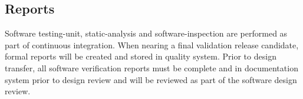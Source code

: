 \subsection{Reports}
Software \gls{testing-unit}, \gls{static-analysis} and \gls{software-inspection}
are performed as part of continuous integration. When nearing a final validation
release candidate, formal reports will be created and stored in quality system.
Prior to design transfer, all software verification reports must be complete and
in documentation system prior to design review and will be reviewed as part of
the software design review.
